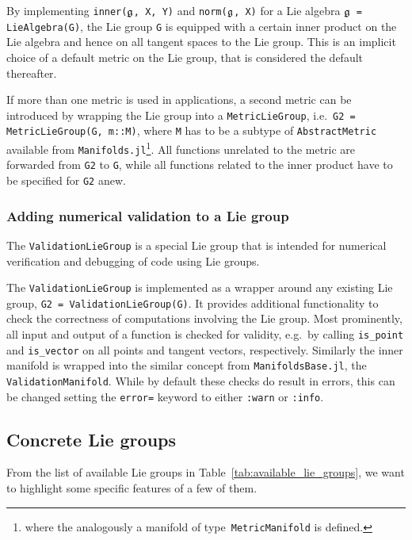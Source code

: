 \documentclass{juliacon}
\begin{document}
By implementing \verb|inner(|$\frak g$\verb|, X, Y)| and \verb|norm(|$\frak g$\verb|, X)| for a Lie algebra $\frak g$\verb| = LieAlgebra(G)|,
the Lie group \verb|G| is equipped with a certain inner product on the Lie algebra and hence on all tangent spaces to the Lie group.
This is an implicit choice of a default metric on the Lie group, that is considered the default thereafter.

If more than one metric is used in applications, a second metric can be introduced
by wrapping the Lie group into a \verb|MetricLieGroup|, i.e.\ \verb|G2 = MetricLieGroup(G, m::M)|, where \verb|M| has to be a subtype of
\verb|AbstractMetric| available from \verb|Manifolds.jl|\footnote{where the analogously a manifold of type~\texttt{MetricManifold} is defined.}.
All functions unrelated to the metric are forwarded from \verb|G2| to \verb|G|, while all functions
related to the inner product have to be specified for \verb|G2| anew.

\subsubsection*{Adding numerical validation to a Lie group}

The \verb|ValidationLieGroup| is a special Lie group that is intended for numerical verification and debugging of code using Lie groups.

The \verb|ValidationLieGroup| is implemented as a wrapper around any existing Lie group, \verb|G2 = ValidationLieGroup(G)|. It provides additional functionality to check the correctness of computations involving the Lie group. Most prominently,
all input and output of a function is checked for validity, e.g.\ by calling \verb|is_point| and \verb|is_vector| on all points and tangent vectors, respectively. Similarly the inner manifold is wrapped into the similar concept from \verb|ManifoldsBase.jl|, the \verb|ValidationManifold|.
While by default these checks do result in errors, this can be changed setting the \verb|error=| keyword to either \verb|:warn| or \verb|:info|.

\subsection{Concrete Lie groups}\label{subsec:ConcreteLieGroups}

From the list of available Lie groups in Table~\ref{tab:available_lie_groups}, we want to highlight some specific features of a few of them.
\end{document}
